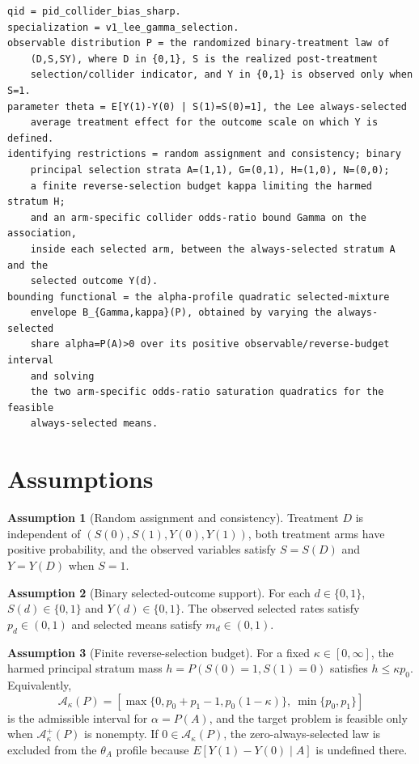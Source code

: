 \documentclass[11pt]{article}
\theoremstyle{definition}
\newtheorem{assumption}{Assumption}
\theoremstyle{plain}
\theoremstyle{remark}
\begin{document}
\begin{verbatim}
qid = pid_collider_bias_sharp.
specialization = v1_lee_gamma_selection.
observable distribution P = the randomized binary-treatment law of
    (D,S,SY), where D in {0,1}, S is the realized post-treatment
    selection/collider indicator, and Y in {0,1} is observed only when S=1.
parameter theta = E[Y(1)-Y(0) | S(1)=S(0)=1], the Lee always-selected
    average treatment effect for the outcome scale on which Y is defined.
identifying restrictions = random assignment and consistency; binary
    principal selection strata A=(1,1), G=(0,1), H=(1,0), N=(0,0);
    a finite reverse-selection budget kappa limiting the harmed stratum H;
    and an arm-specific collider odds-ratio bound Gamma on the association,
    inside each selected arm, between the always-selected stratum A and the
    selected outcome Y(d).
bounding functional = the alpha-profile quadratic selected-mixture
    envelope B_{Gamma,kappa}(P), obtained by varying the always-selected
    share alpha=P(A)>0 over its positive observable/reverse-budget interval
    and solving
    the two arm-specific odds-ratio saturation quadratics for the feasible
    always-selected means.
\end{verbatim}

\section{Assumptions}
\begin{assumption}[Random assignment and consistency]\label{ass:random-consistency}
Treatment \(D\) is independent of \((S(0),S(1),Y(0),Y(1))\), both treatment arms have positive probability, and the observed variables satisfy \(S=S(D)\) and \(Y=Y(D)\) when \(S=1\).
\end{assumption}

\begin{assumption}[Binary selected-outcome support]\label{ass:binary-support}
For each \(d\in\{0,1\}\), \(S(d)\in\{0,1\}\) and \(Y(d)\in\{0,1\}\).  The observed selected rates satisfy \(p_d\in(0,1)\) and selected means satisfy \(m_d\in(0,1)\).
\end{assumption}

\begin{assumption}[Finite reverse-selection budget]\label{ass:reverse-budget}
For a fixed \(\kappa\in[0,\infty]\), the harmed principal stratum mass \(h=P(S(0)=1,S(1)=0)\) satisfies \(h\le \kappa p_0\).  Equivalently,
\[
  \mathcal A_\kappa(P)=
  [\max\{0,p_0+p_1-1,p_0(1-\kappa)\},\ \min\{p_0,p_1\}]
\]
is the admissible interval for \(\alpha=P(A)\), and the target problem is feasible only when \(\mathcal A_\kappa^+(P)\) is nonempty.  If \(0\in\mathcal A_\kappa(P)\), the zero-always-selected law is excluded from the \(\theta_A\) profile because \(E[Y(1)-Y(0)\mid A]\) is undefined there.
\end{assumption}
\end{document}
